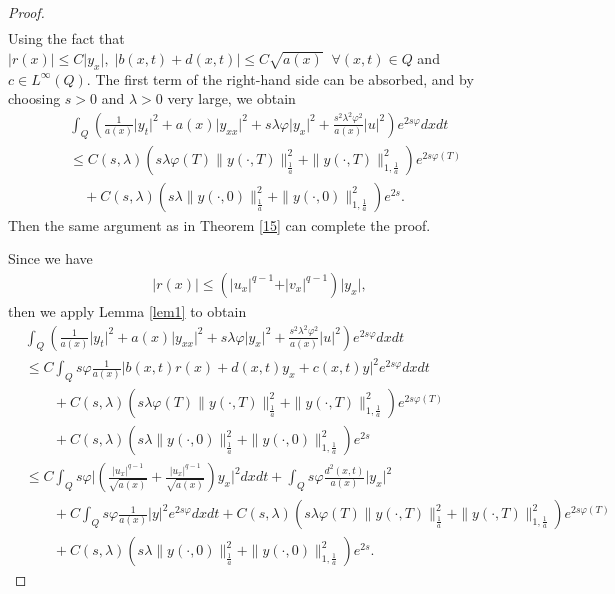 \documentclass[reqno]{amsart}
\theoremstyle{plain}
\theoremstyle{remark}
\numberwithin{equation}{section}
\begin{document}
\begin{proof}
\begin{align*}
\end{align*}
Using the fact that $\vert r(x) \vert \leqslant C \vert y_{x}\vert, \;\vert b(x,t)+ d(x,t)\vert\leqslant C \sqrt{a(x)} \;\; \forall (x,t)\in Q $ and $c\in L^{\infty}(Q)$. The first term of the right-hand side can be absorbed, and by choosing $s>0$ and $\lambda >0$ very large, we obtain
\begin{equation*}
    \begin{aligned}
    &\int_{Q} \left(\frac{1}{a(x)}\vert y_{t}\vert^2+ a(x)\vert y_{xx}\vert^2+ s\lambda \varphi \vert y_{x}\vert^2+ \frac{s^2\lambda^2\varphi^2}{a(x)}\vert u\vert^2\right)e^{2s\varphi}dxdt\\&
    \leqslant C( s,\lambda)\left( s\lambda\varphi(T)\| y(\cdot,T)\|_{\frac{1}{a}}^2+\| y(\cdot,T)\|_{1,\frac{1}{a}}^2 \right)e^{2s\varphi(T)}\\& \quad +C(s,\lambda)\left( s\lambda\| y(\cdot,0)\|_{\frac{1}{a}}^2+\| y(\cdot,0)\|_{1,\frac{1}{a}}^2\right)e^{2s}.
\end{aligned}
\end{equation*}
Then the same argument as in Theorem \ref{15} can complete the proof.
\smallskip

 Since we have 
\begin{align*}
    \vert r(x) \vert \leqslant \left(\vert u_{x}\vert^{q-1}+\vert v_{x}\vert^{q-1}\right)\vert y_{x}\vert,
\end{align*}
then we apply Lemma \ref{lem1} to obtain
\begin{align*}
    &\int_{Q} \left(\frac{1}{a(x)}\vert y_{t}\vert^2+ a(x)\vert y_{xx}\vert^2+ s\lambda \varphi  \vert y_{x}\vert^2+ \frac{s^2\lambda^2\varphi^2}{a(x)}\vert u\vert^2\right)e^{2s\varphi}dxdt\\&\leqslant C  \int_{Q}s\varphi\frac{1}{a(x)}\vert b(x,t)r(x)+ d(x,t)y_{x} + c(x,t) y\vert^2e^{2s\varphi} dxdt \\&\qquad+C( s,\lambda)\left( s\lambda\varphi(T)\| y(\cdot,T)\|_{\frac{1}{a}}^2+\| y(\cdot,T)\|_{1,\frac{1}{a}}^2 \right)e^{2s\varphi(T)} \\&\qquad
    +C(s,\lambda)\left( s\lambda\| y(\cdot,0)\|_{\frac{1}{a}}^2+\| y(\cdot,0)\|_{1,\frac{1}{a}}^2\right)e^{2s}\\ &\leqslant C  \int_{Q}s\varphi \lvert \left( \frac{\vert u_{x}\vert^{q-1}}{\sqrt{a(x)}}+\frac{\vert u_{x}\vert^{q-1}}{\sqrt{a(x)}}\right)y_{x}\rvert^2 dxdt + \int_{Q}s\varphi{\frac{d^2(x,t)}{a(x)}}\vert y_{x}\vert^2\\& \qquad+ C \int_{Q}s\varphi\frac{1}{a(x)}  \vert y\vert^2e^{2s\varphi} dxdt +C( s,\lambda)\left( s\lambda\varphi(T)\| y(\cdot,T)\|_{\frac{1}{a}}^2+\| y(\cdot,T)\|_{1,\frac{1}{a}}^2 \right)e^{2s\varphi(T)}\\&\qquad+C(s,\lambda)\left( s\lambda\| y(\cdot,0)\|_{\frac{1}{a}}^2+\| y(\cdot,0)\|_{1,\frac{1}{a}}^2\right)e^{2s}.
\end{align*}

\end{proof}
\end{document}
